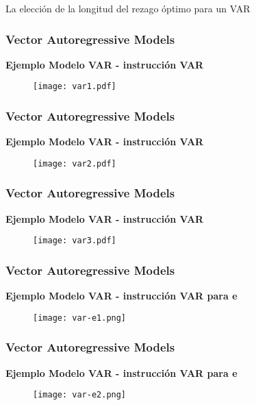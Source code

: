 \documentclass[spanish,xcolor=table]{beamer}
\begin{document}
\begin{section}{La elecci\'on de la longitud del rezago \'optimo para un VAR}
\begin{frame}
\frametitle{Vector Autoregressive Models}
\textbf{Ejemplo Modelo VAR - instrucci\'on VAR}

\begin{figure}[t!]
\texttt{[image: var1.pdf]}
\end{figure}

\end{frame}
\begin{frame}
\frametitle{Vector Autoregressive Models}
\textbf{Ejemplo Modelo VAR - instrucci\'on VAR}

\begin{figure}[t!]
\texttt{[image: var2.pdf]}
\end{figure}

\end{frame}
\begin{frame}
\frametitle{Vector Autoregressive Models}
\textbf{Ejemplo Modelo VAR - instrucci\'on VAR}

\begin{figure}[t!]
\texttt{[image: var3.pdf]}
\end{figure}

\end{frame}
\begin{frame}
\frametitle{Vector Autoregressive Models}
\textbf{Ejemplo Modelo VAR - instrucci\'on VAR para e}

\begin{figure}[t!]
\texttt{[image: var-e1.png]}
\end{figure}

\end{frame}
\begin{frame}
\frametitle{Vector Autoregressive Models}
\textbf{Ejemplo Modelo VAR - instrucci\'on VAR para e}

\begin{figure}[t!]
\texttt{[image: var-e2.png]}
\end{figure}


\end{frame}
\end{section}
\end{document}
